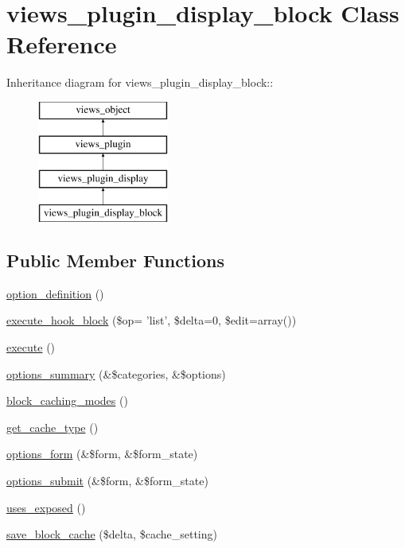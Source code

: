 \hypertarget{classviews__plugin__display__block}{
\section{views\_\-plugin\_\-display\_\-block Class Reference}
\label{classviews__plugin__display__block}
}
Inheritance diagram for views\_\-plugin\_\-display\_\-block::\begin{figure}[H]
\begin{center}
\leavevmode
\includegraphics[height=4cm]{classviews__plugin__display__block}
\end{center}
\end{figure}
\subsection*{Public Member Functions}
\begin{CompactItemize}
\item 
\hyperlink{classviews__plugin__display__block_aa7cd040bd224b13bb6cada38451b26b}{option\_\-definition} ()
\item 
\hyperlink{classviews__plugin__display__block_ff736419764b181899a2dee45a81291e}{execute\_\-hook\_\-block} (\$op= 'list', \$delta=0, \$edit=array())
\item 
\hyperlink{classviews__plugin__display__block_d673f5b3462304a522ead4293a8f7cef}{execute} ()
\item 
\hyperlink{classviews__plugin__display__block_52bb2499272275963128bb2beb5804ce}{options\_\-summary} (\&\$categories, \&\$options)
\item 
\hyperlink{classviews__plugin__display__block_c5a9a1d276df4c6a01a3076be5e4f0aa}{block\_\-caching\_\-modes} ()
\item 
\hyperlink{classviews__plugin__display__block_4be2fbe3e5f223215268bdd13cdd0312}{get\_\-cache\_\-type} ()
\item 
\hyperlink{classviews__plugin__display__block_251f0aa56cead04c51c4b1d633826640}{options\_\-form} (\&\$form, \&\$form\_\-state)
\item 
\hyperlink{classviews__plugin__display__block_aac31f678cc192896bcfdeb1a8a5a2c7}{options\_\-submit} (\&\$form, \&\$form\_\-state)
\item 
\hyperlink{classviews__plugin__display__block_b0995994a4c7436de2790c7ad8d7ea74}{uses\_\-exposed} ()
\item 
\hyperlink{classviews__plugin__display__block_58ba8f810894ad2e7c43c49552005ceb}{save\_\-block\_\-cache} (\$delta, \$cache\_\-setting)
\end{CompactItemize}


